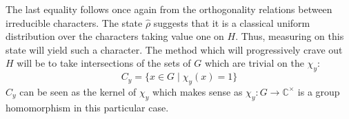 \documentclass{../quantum.tex}
\begin{document}
The last equality follows once again from the orthogonality relations between irreducible characters.
%
The state $\hat{\rho}$ suggests that it is a classical uniform distribution over the characters taking value one on $H$. Thus, measuring on this state will yield such a character. The method which will progressively crave out $H$ will be to take intersections of the sets of $G$ which are trivial on the $\chi_y$:
$$ C_{y} = \{ x \in G \mid \chi_y(x) = 1 \} $$
$C_{y}$ can be seen as the kernel of $\chi_y$ which makes sense as  $\chi_y: G \rightarrow \mathbb{C}^\times$ is a group homomorphism in this particular case.
\end{document}
